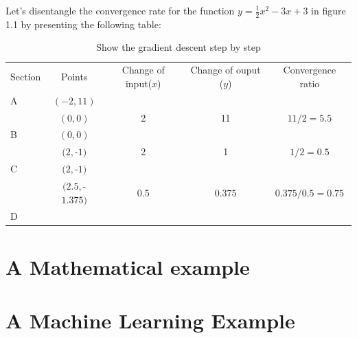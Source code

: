 \documentclass[12pt]{article}
\theoremstyle{definition}
\numberwithin{equation}{section}
\numberwithin{figure}{section}
\numberwithin{table}{section}
\begin{document}
Let's disentangle the convergence rate for the function $y= \frac{1}{2}x^2 - 3x + 3$ in figure 1.1 by presenting the following table:
\begin{table}[H]
  \centering
  \caption{Show the gradient descent step by step}
  \begin{tabular}{lcccc}
    \hline
    \hline
    Section & Points & Change of input($x$) & Change of ouput ($y$) & Convergence ratio  \\
    A & $(-2, 11)$ & \\
    & $(0,0)$ & 2 & 11 & $11/2 = 5.5$ \\
    \hline
    B & $(0,0)$ & \\
    & $(2, $-$1)$ & 2 & 1 & $1/2 = 0.5$ \\
      \hline
    C & $(2, $-$1)$ &  \\
    & $(2.5, $-$1.375)$ & 0.5 & 0.375 & $0.375/0.5 = 0.75$ \\
    \hline
    D & 
  \end{tabular}
\end{table}


\section{A Mathematical example}


\section{A Machine Learning Example}

























\newpage


\end{document}
